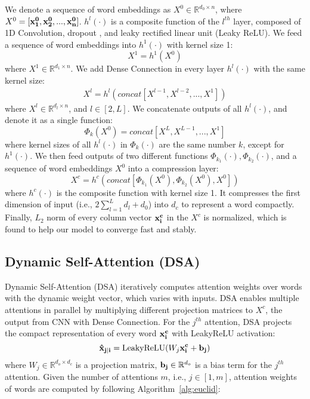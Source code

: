 \documentclass[11pt,a4paper]{article}
\begin{document}
We denote a sequence of word embeddings as ${X^{0}}\in \mathbb{R}^{d_0 \times n}$, where ${X^{0}} = [\bf {x^{0}_{1}}, {\bf x^{0}_{2}}, ... , {\bf x^{0}_{n}}]$. $h^l(\cdot)$ is a composite function of the $l^{th}$ layer, composed of 1D Convolution, dropout \cite{dropout}, and leaky rectified
linear unit (Leaky ReLU). We feed a sequence of word embeddings into $h^1(\cdot)$ with kernel size 1:
\begin{equation}
{X}^{1} = {h^1}(X^0)\label{eq2}
\end{equation}
where ${X^{1}}\in \mathbb{R}^{d_{1} \times n}$. We add Dense Connection in every layer $h^l(\cdot)$ with the same kernel size:
\begin{align}
{X}^{l} = {h^{l}}(concat[X^{l-1},X^{l-2},...,X^{1}])\label{eq3}
\end{align}
where ${X^{l}}\in \mathbb{R}^{d_{l} \times n}$, and $l\in[2,L]$. We concatenate outputs of all $h^l(\cdot)$, and denote it as a single function:
\begin{equation}
\Phi_k(X^0) = concat[X^L, X^{L-1}, ..., X^1]\label{eq4}
\end{equation}
where kernel sizes of all $h^l(\cdot)$ in $\Phi_k(\cdot)$ are the same number $k$, except for $h^1(\cdot)$. We then feed outputs of two different functions $\Phi_{k_1}(\cdot), \Phi_{k_2}(\cdot)$, and a sequence of word embeddings $X^0$ into a compression layer:
\begin{equation}
{X}^{c} = h^{c}(concat[\Phi_{k_1}(X^0), \Phi_{k_2}(X^0), X^0])\label{eq5}
\end{equation}
where $h^{c}(\cdot)$ is the composite function with kernel size 1. It compresses the first dimension of input (i.e., ${2\sum_{l=1}^{L} d_{l} + d_0}$) into $d_{c}$ to represent a word compactly. Finally, $L_2$ norm of every column vector $\bf{x^{c}_i}$ in the $X^c$ is normalized, which is found to help our model to converge fast and stably.




\subsection{Dynamic Self-Attention (DSA)}\label{module2}
Dynamic Self-Attention (DSA) iteratively computes attention weights over words with the dynamic weight vector, which varies with inputs. DSA enables multiple attentions in parallel by multiplying different projection matrices to ${X^{c}}$, the output from CNN with Dense Connection. For the $j^{th}$ attention, DSA projects the compact representation of every word $\bf x^{c}_i$ with LeakyReLU activation:
\begin{equation}
{\bf {\hat x}_{j|i}} = \text{LeakyReLU}(W_j {\bf x^{c}_i} + {\bf b_j})\label{eq6}
\end{equation}
where ${W_j}\in \mathbb{R}^{d_{o} \times d_{c}}$ is a projection matrix, ${\bf b_j} \in \mathbb{R}^{d_o}$ is a bias term for the $j^{th}$ attention. Given the number of attentions $m$, i.e., $j\in[1,m]$, attention weights of words are computed by following Algorithm~\ref{alg:euclid}:
\end{document}
